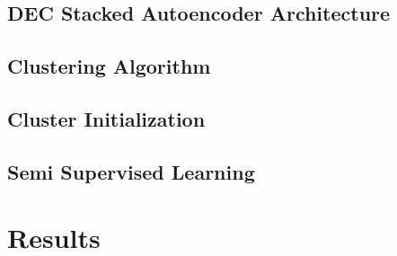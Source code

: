 \documentclass{article}
\begin{document}
\subsection{DEC Stacked Autoencoder Architecture}

\subsection{Clustering Algorithm}

\subsection{Cluster Initialization}

\subsection{Semi Supervised Learning}





















\section{Results}























\end{document}
